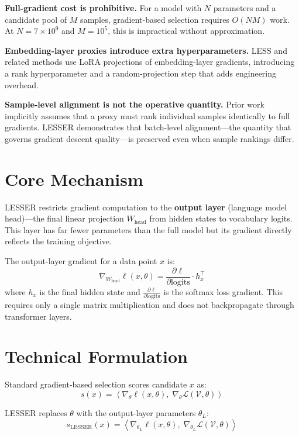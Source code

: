 \documentclass[10pt,twocolumn]{article}
\begin{document}
\textbf{Full-gradient cost is prohibitive.} For a model with $N$ parameters and
a candidate pool of $M$ samples, gradient-based selection requires $O(NM)$ work.
At $N = 7 \times 10^9$ and $M = 10^5$, this is impractical without
approximation.

\textbf{Embedding-layer proxies introduce extra hyperparameters.} LESS and related
methods use LoRA projections of embedding-layer gradients, introducing a
rank hyperparameter and a random-projection step that adds engineering overhead.

\textbf{Sample-level alignment is not the operative quantity.} Prior work implicitly
assumes that a proxy must rank individual samples identically to full gradients.
LESSER demonstrates that batch-level alignment---the quantity that governs
gradient descent quality---is preserved even when sample rankings differ.

\section{Core Mechanism}

LESSER restricts gradient computation to the \textbf{output layer} (language
model head)---the final linear projection $W_\text{head}$ from hidden states
to vocabulary logits. This layer has far fewer parameters than the full model
but its gradient directly reflects the training objective.

The output-layer gradient for a data point $x$ is:
\[
\nabla_{W_\text{head}} \ell(x, \theta) = \frac{\partial \ell}{\partial \text{logits}} \cdot h_x^\top
\]
where $h_x$ is the final hidden state and $\frac{\partial \ell}{\partial \text{logits}}$
is the softmax loss gradient. This requires only a single matrix multiplication
and does not backpropagate through transformer layers.

\section{Technical Formulation}

Standard gradient-based selection scores candidate $x$ as:
\[
s(x) = \left\langle \nabla_\theta \ell(x, \theta),\; \nabla_\theta \mathcal{L}(\mathcal{V}, \theta) \right\rangle
\]

LESSER replaces $\theta$ with the output-layer parameters $\theta_L$:
\[
s_\text{LESSER}(x) = \left\langle \nabla_{\theta_L} \ell(x, \theta),\; \nabla_{\theta_L} \mathcal{L}(\mathcal{V}, \theta) \right\rangle
\]
\end{document}
